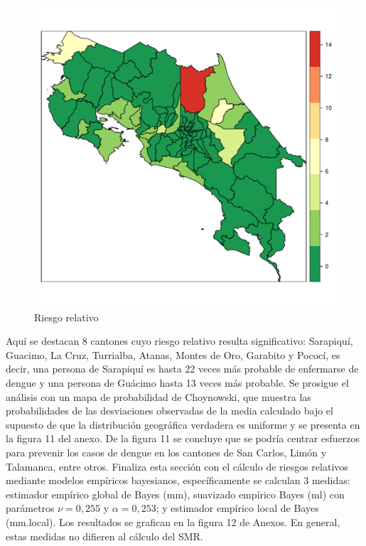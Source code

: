 \documentclass[12pt,a4paper]{article}
\begin{document}
\begin{figure}[hbtp]
\centering
\includegraphics[scale=0.75]{F5.pdf}
\caption{Riesgo relativo}
\end{figure}

Aquí se destacan 8 cantones cuyo riesgo relativo resulta significativo: Sarapiquí, Guacimo, La Cruz, Turrialba, Atanas, Montes de Oro, Garabito y Pococí, es decir, una persona de Sarapiquí es hasta 22 veces más probable de enfermarse de dengue y una persona de Guácimo hasta 13 veces más probable. Se prosigue el análisis con un mapa de probabilidad de Choynowski, que muestra las probabilidades de las desviaciones observadas de la media calculado bajo el supuesto de que la distribución geográfica verdadera es uniforme y se presenta en la figura 11 del anexo. De la figura 11 se concluye que se podría centrar esfuerzos para prevenir los casos de dengue en los cantones de San Carlos, Limón y Talamanca, entre otros.
\newline
Finaliza esta sección con el cálculo de riesgos relativos mediante modelos empíricos bayesianos, específicamente se calculan 3 medidas: estimador empírico global de Bayes (mm), suavizado empírico Bayes (ml) con parámetros $\nu = 0,255$ y $\alpha = 0,253$; y estimador empírico local de Bayes (mm.local). Los resultados se grafican en la figura 12 de Anexos. En general, estas medidas no difieren al cálculo del SMR.
\end{document}
